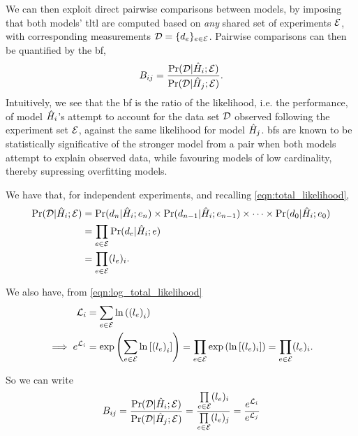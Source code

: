 We can then exploit direct pairwise comparisons between models,  
    by imposing that both models' \gls{tltl} are computed based 
    on \emph{any} shared set of \glspl{experiment} ${ \mathcal{E} }$, 
    with corresponding measurements ${ \mathcal{D} } = \{ d_{e}\}_{e \in { \mathcal{E} }}$.
Pairwise comparisons can then be quantified by the \gls{bf},
\begin{equation}
    \label{eqn:bayes_factors}
    B_{ij} = \frac{\Pr({ \mathcal{D} } | \hat{H}_i; { \mathcal{E} })}{\Pr({ \mathcal{D} } | \hat{H}_j; { \mathcal{E} })}.
\end{equation}
Intuitively, we see that the \gls{bf} is the ratio of the \gls{likelihood}, i.e. the performance, 
    of model $\hat{H}_i$'s attempt to account for the data set ${ \mathcal{D} }$ observed following the 
    \gls{experiment} set ${ \mathcal{E} }$, against the same \gls{likelihood} for model $\hat{H}_j$.
\glspl{bf} are known to be statistically significative of the stronger model 
    from a pair when both models attempt to explain observed data,
    while favouring models of low cardinality, thereby supressing overfitting models. 
\par 

We have that, for independent \glspl{experiment}, and recalling \cref{eqn:total_likelihood}, 
\begin{align}
    \begin{split}
        \Pr({ \mathcal{D} } | \hat{H}_i; { \mathcal{E} }) &= \Pr(d_n | \hat{H}_i; e_n) \times \Pr(d_{n-1} | \hat{H}_i; e_{n-1}) \times \dots \times \Pr(d_0 | \hat{H}_i; e_0) \\
        &= \prod_{e \in { \mathcal{E} }} \Pr(d_e | \hat{H}_i; e) \\
        &= \prod_{e \in { \mathcal{E} }} (l_{e})_i.
    \end{split}
\end{align}

We also have, from \cref{eqn:log_total_likelihood}
\begin{align}
    \label{eqn:log_likelihood}
    \begin{split}
        {\mathcal{L}}_{i} &= \sum_{e \in { \mathcal{E} }} \ln\left(\left(l_{e}\right)_i\right) \\
        \implies e^{{\mathcal{L}}_{i}} &= \exp \left( \sum_{e \in { \mathcal{E} }} \ln \left[ \left(l_{e}\right)_i\right] \right) 
        = \prod_{e \in { \mathcal{E} }} \exp \left( \ln \left[ (l_{e})_i \right]  \right) 
        = \prod_{e \in { \mathcal{E} }} (l_{e})_i.
    \end{split}
\end{align}

So we can write 
\begin{align}
    \label{eqn:bf_by_ll}
    \begin{split}
        B_{ij} &= \frac{\Pr({ \mathcal{D} } | \hat{H}_i; { \mathcal{E} })}{\Pr({ \mathcal{D} } | \hat{H}_j; { \mathcal{E} })} 
        = \frac{ \prod\limits_{e \in { \mathcal{E} }} (l_{e})_i } {\prod\limits_{e \in { \mathcal{E} }} (l_{e})_j } 
        = \frac{e^{{\mathcal{L}}_{i}}}{e^{{\mathcal{L}}_{j}}} \\
    \end{split}
\end{align}

